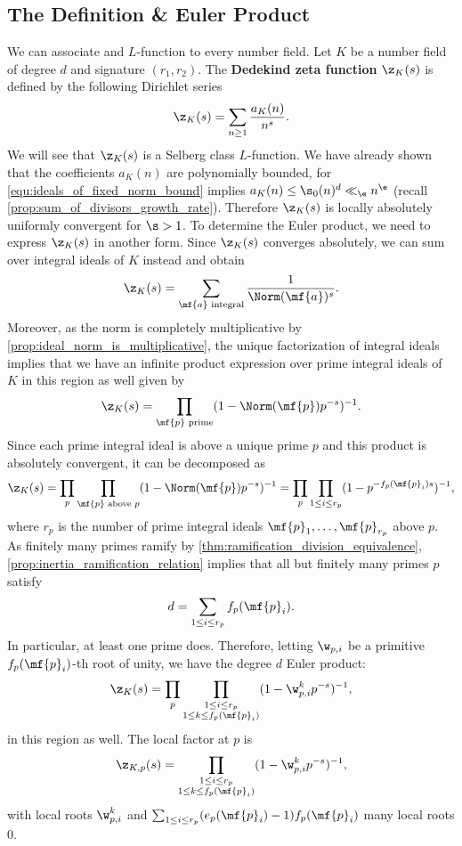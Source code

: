     \subsection*{The Definition \& Euler Product}
      We can associate and $L$-function to every number field. Let $K$ be a number field of degree $d$ and signature $(r_{1},r_{2})$. The \textbf{Dedekind zeta function} $\z_{K}(s)$ is defined by the following Dirichlet series
      \[
        \z_{K}(s) = \sum_{n \ge 1}\frac{a_{K}(n)}{n^{s}}.
      \]
      We will see that $\z_{K}(s)$ is a Selberg class $L$-function. We have already shown that the coefficients $a_{K}(n)$ are polynomially bounded, for \cref{equ:ideals_of_fixed_norm_bound} implies $a_{K}(n) \le \s_{0}(n)^{d} \ll_{\e} n^{\e}$ (recall \cref{prop:sum_of_divisors_growth_rate}). Therefore $\z_{K}(s)$ is locally absolutely uniformly convergent for $\s > 1$. To determine the Euler product, we need to express $\z_{K}(s)$ in another form. Since $\z_{K}(s)$ converges absolutely, we can sum over integral ideals of $K$ instead and obtain
      \[
        \z_{K}(s) = \sum_{\text{$\mf{a}$ integral}}\frac{1}{\Norm(\mf{a})^{s}}.
      \]
      Moreover, as the norm is completely multiplicative by \cref{prop:ideal_norm_is_multiplicative}, the unique factorization of integral ideals implies that we have an infinite product expression over prime integral ideals of $K$ in this region as well given by 
      \[
        \z_{K}(s) = \prod_{\text{$\mf{p}$ prime}}(1-\Norm(\mf{p})p^{-s})^{-1}.
      \]
      Since each prime integral ideal is above a unique prime $p$ and this product is absolutely convergent, it can be decomposed as
      \[
        \z_{K}(s) = \prod_{p}\prod_{\text{$\mf{p}$ above $p$}}(1-\Norm(\mf{p})p^{-s})^{-1} = \prod_{p}\prod_{1 \le i \le r_{p}}(1-p^{-f_{p}(\mf{p}_{i})s})^{-1},
      \]
      where $r_{p}$ is the number of prime integral ideals $\mf{p}_{1},\ldots,\mf{p}_{r_{p}}$ above $p$. As finitely many primes ramify by \cref{thm:ramification_division_equivalence}, \cref{prop:inertia_ramification_relation} implies that all but finitely many primes $p$ satisfy
      \[
        d = \sum_{1 \le i \le r_{p}}f_{p}(\mf{p}_{i}).
      \]
      In particular, at least one prime does. Therefore, letting $\w_{p,i}$ be a primitive $f_{p}(\mf{p}_{i})$-th root of unity, we have the degree $d$ Euler product:
      \[
        \z_{K}(s) = \prod_{p}\prod_{\substack{1 \le i \le r_{p} \\ 1 \le k \le f_{p}(\mf{p}_{i})}}(1-\w_{p,i}^{k}p^{-s})^{-1},
      \]
      in this region as well. The local factor at $p$ is
      \[
        \z_{K,p}(s) = \prod_{\substack{1 \le i \le r_{p} \\ 1 \le k \le f_{p}(\mf{p}_{i})}}(1-\w_{p,i}^{k}p^{-s})^{-1},
      \]
      with local roots $\w_{p,i}^{k}$ and $\sum_{1 \le i \le r_{p}}(e_{p}(\mf{p}_{i})-1)f_{p}(\mf{p}_{i})$ many local roots $0$.
